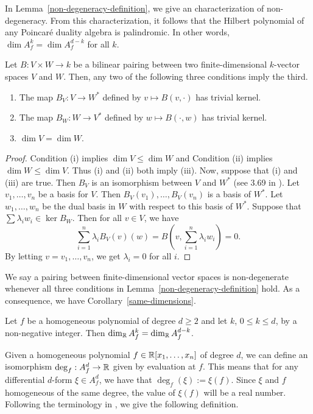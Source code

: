 \documentclass{puthesis-UG}
\begin{document}
In Lemma~\ref{non-degeneracy-definition}, we give an characterization of non-degeneracy. From this characterization, it follows that the Hilbert polynomial of any Poincar\'e duality algebra is palindromic. In other words, $\dim A_f^k = \dim A_f^{d-k}$ for all $k$. 

\begin{lem} \label{non-degeneracy-definition}
	Let $B : V \times W \to k$ be a bilinear pairing between two finite-dimensional $k$-vector spaces $V$ and $W$. Then, any two of the following three conditions imply the third. 
		\begin{enumerate}[label = (\roman*)]
			\item The map $B_V : V \to W^*$ defined by $v \mapsto B(v, \cdot)$ has trivial kernel.
			\item The map $B_W : W \to V^*$ defined by $w \mapsto B(\cdot, w)$ has trivial kernel. 
			\item $\dim V = \dim W$. 
		\end{enumerate}
	\end{lem}

	\begin{proof}
		Condition (i) implies $\dim V \leq \dim W$ and Condition (ii) implies $\dim W \leq \dim V$. Thus (i) and (ii) both imply (iii). Now, suppose that (i) and (iii) are true. Then $B_V$ is an isomorphism between $V$ and $W^*$ (see 3.69 in \cite{axler}). Let $v_1, \ldots, v_n$ be a basis for $V$. Then $B_V(v_1), \ldots, B_V(v_n)$ is a basis of $W^*$. Let $w_1, \ldots, w_n$ be the dual basis in $W$ with respect to this basis of $W^*$. Suppose that $\sum \lambda_i w_i \in \ker B_W$. Then for all $v \in V$, we have 
		\[
			\sum_{i = 1}^n \lambda_i B_V(v)(w) = B \left ( v, \sum_{i = 1}^n \lambda_i w_i \right ) = 0. 
		\]
		By letting $v = v_1, \ldots, v_n$, we get $\lambda_i = 0$ for all $i$. 
	\end{proof}

We say a pairing between finite-dimensional vector spaces is non-degenerate whenever all three conditions in Lemma~\ref{non-degeneracy-definition} hold. As a consequence, we have Corollary~\ref{same-dimensions}.

\begin{cor} \label{same-dimensions}
	Let $f$ be a homogeneous polynomial of degree $d \geq 2$ and let $k$, $0 \leq k \leq d$, by a non-negative integer. Then $\dim_{\mathbb{R}} A_f^k = \dim_{\mathbb{R}} A_f^{d-k}$. 
\end{cor}

Given a homogeneous polynomial $f \in \mathbb{R}[x_1, \ldots, x_n]$ of degree $d$, we can define an isomorphism $\deg_f : A_f^d \to \mathbb{R}$ given by evaluation at $f$. This means that for any differential $d$-form $\xi \in A_f^d$, we have that $\deg_f (\xi) := \xi(f)$. Since $\xi$ and $f$ homogeneous of the same degree, the value of $\xi(f)$ will be a real number. Following the terminology in \cite{AHK}, we give the following definition. 
\end{document}
